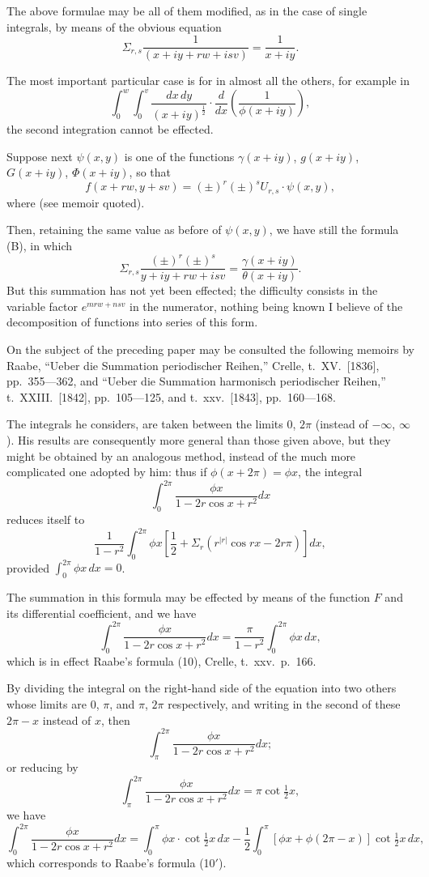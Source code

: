 \documentclass[11pt,a4paper]{book}
\begin{document}
The above formulae may be all of them modified, as in the case of single integrals, by means of the obvious equation
\[\Sigma_{r,s} \frac{1}{(x+iy+rw+isv)} = \frac{1}{x+iy}.\]

The most important particular case is for in almost all the others, for example in
\[\int_0^w\!\!\int_0^v \frac{dx \, dy}{(x+iy)^{\frac{1}{2}}} \cdot \frac{d}{dx}\left(\frac{1}{\phi(x+iy)}\right),\]
the second integration cannot be effected.

Suppose next $\psi(x,y)$ is one of the functions $\gamma(x+iy)$, $g(x+iy)$, $G(x+iy)$, $\Phi(x+iy)$, so that
\[f(x+rw, y+sv) = (\pm)^r (\pm)^s U_{r,s} \cdot \psi(x,y),\]
where (see memoir quoted).

Then, retaining the same value as before of $\psi(x,y)$, we have still the formula (B), in which
\[\Sigma_{r,s} \frac{(\pm)^r (\pm)^s}{y+iy+rw+isv} = \frac{\gamma(x+iy)}{\theta(x+iy)}.\]
But this summation has not yet been effected; the difficulty consists in the variable factor $e^{mrw+nsv}$ in the numerator, nothing being known I believe of the decomposition of functions into series of this form.

On the subject of the preceding paper may be consulted the following memoirs by Raabe, ``Ueber die Summation periodischer Reihen,'' Crelle, t.\ XV.\ [1836], pp.\ 355---362, and ``Ueber die Summation harmonisch periodischer Reihen,'' t.\ XXIII.\ [1842], pp.\ 105---125, and t.\ xxv.\ [1843], pp.\ 160---168.

The integrals he considers, are taken between the limits $0$, $2\pi$ (instead of $-\infty$, $\infty$). His results are consequently more general than those given above, but they might be obtained by an analogous method, instead of the much more complicated one adopted by him: thus if $\phi(x+2\pi) = \phi x$, the integral
\[\int_0^{2\pi} \frac{\phi x}{1-2r\cos x + r^2} dx\]
reduces itself to
\[\frac{1}{1-r^2} \int_0^{2\pi} \phi x \left[\frac{1}{2} + \Sigma_r (r^{|r|} \cos rx - 2r\pi)\right] dx,\]
provided $\int_0^{2\pi} \phi x \, dx = 0$.

The summation in this formula may be effected by means of the function $F$ and its differential coefficient, and we have
\[\int_0^{2\pi} \frac{\phi x}{1-2r\cos x + r^2} dx = \frac{\pi}{1-r^2} \int_0^{2\pi} \phi x \, dx,\]
which is in effect Raabe's formula (10), Crelle, t.\ xxv.\ p.\ 166.

By dividing the integral on the right-hand side of the equation into two others whose limits are $0$, $\pi$, and $\pi$, $2\pi$ respectively, and writing in the second of these $2\pi - x$ instead of $x$, then
\[\int_{\pi}^{2\pi} \frac{\phi x}{1-2r\cos x + r^2} dx;\]
or reducing by
\[\int_{\pi}^{2\pi} \frac{\phi x}{1-2r\cos x + r^2} dx = \pi \cot \tfrac{1}{2}x,\]
we have
\[\int_0^{2\pi} \frac{\phi x}{1-2r\cos x + r^2} dx = \int_0^{\pi} \phi x \cdot \cot \tfrac{1}{2}x \, dx - \frac{1}{2} \int_0^{\pi} [\phi x + \phi(2\pi - x)] \cot \tfrac{1}{2}x \, dx,\]
which corresponds to Raabe's formula (10$'$).
\end{document}
